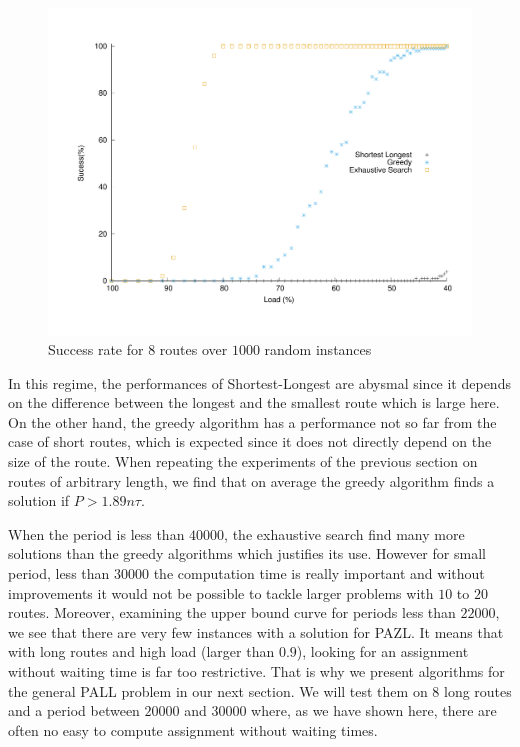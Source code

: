 \documentclass[a4paper,10pt]{article}
\begin{document}
{\begin{figure}

       \begin{center}
      \includegraphics[scale=0.4]{echec_longues.pdf}
      \end{center}
      \caption{Success rate for $8$ routes over $1000$ random instances}
     \end{figure}
      
      In this regime, the performances of Shortest-Longest are abysmal since it depends on the difference between the longest and the smallest route which is large here. On the other hand, the greedy algorithm has a performance not so far from the case of short routes, which is expected since it does not directly depend on the size of the route. When repeating the experiments of the previous section on routes of arbitrary length, we find that on average the greedy algorithm finds a solution if $P>1.89n\tau$.
      
      When the period is less than $40000$, the exhaustive search find many more solutions than the greedy algorithms which justifies its use. However for small period, less than $30000$ the computation time is really important and without improvements it would not be possible to tackle larger problems with $10$ to $20$ routes. Moreover, examining the upper bound curve for periods less than $22000$, we see that there are very few instances with a solution for PAZL. It means that with long routes and high load (larger than $0.9$), looking for an assignment without waiting time is far too restrictive. That is why we present algorithms for the general PALL problem in our next section. We will test them on $8$ long routes and a period between $20000$ and $30000$ where, as we have shown here, there are often no easy to compute assignment without waiting times.
      
}
\end{document}
